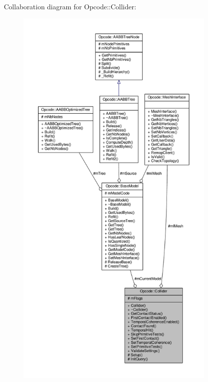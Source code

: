 Collaboration diagram for Opcode\+:\+:Collider\+:
\nopagebreak
\begin{figure}[H]
\begin{center}
\leavevmode
\includegraphics[height=550pt]{d2/d1d/classOpcode_1_1Collider__coll__graph}
\end{center}
\end{figure}
